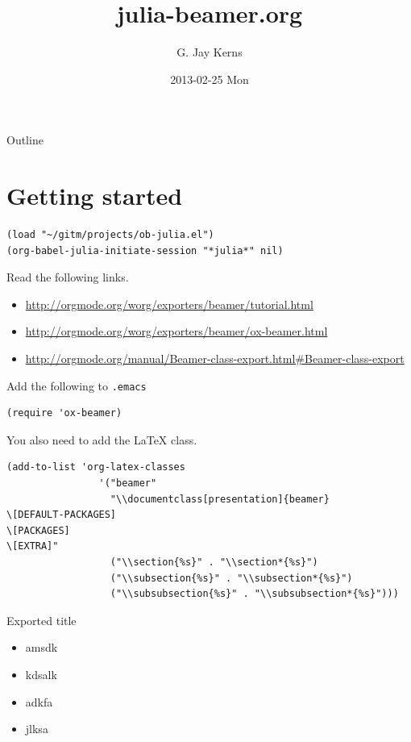 \documentclass[presentation, bigger]{beamer}
\author{G. Jay Kerns}
\date{2013-02-25 Mon}
\title{julia-beamer.org}
\begin{document}
\maketitle
\begin{frame}{Outline}
\tableofcontents
\end{frame}



\section[Getting started]{Getting started}
\label{sec-1}

\begin{verbatim}
(load "~/gitm/projects/ob-julia.el")
(org-babel-julia-initiate-session "*julia*" nil)
\end{verbatim}

Read the following links.
\begin{itemize}
\item \url{http://orgmode.org/worg/exporters/beamer/tutorial.html}
\item \url{http://orgmode.org/worg/exporters/beamer/ox-beamer.html}
\item \url{http://orgmode.org/manual/Beamer-class-export.html#Beamer-class-export}
\end{itemize}

Add the following to \texttt{.emacs}

\begin{verbatim}
(require 'ox-beamer)
\end{verbatim}

You also need to add the \LaTeX{} class.

\begin{verbatim}
(add-to-list 'org-latex-classes
                '("beamer"
                  "\\documentclass[presentation]{beamer}
\[DEFAULT-PACKAGES]
\[PACKAGES]
\[EXTRA]"
                  ("\\section{%s}" . "\\section*{%s}")
                  ("\\subsection{%s}" . "\\subsection*{%s}")
                  ("\\subsubsection{%s}" . "\\subsubsection*{%s}")))
\end{verbatim}

\begin{frame}[label=sec-1-1]{Exported title}
\begin{itemize}
\item amsdk
\item kdsalk
\item adkfa
\item jlksa
\end{itemize}
\end{frame}
\end{document}
